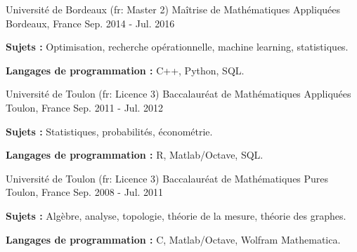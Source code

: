 

\begin{cventries}

  \cventry
    {Université de Bordeaux (fr: Master 2)} %
    {Maîtrise de Mathématiques Appliquées} %
    {Bordeaux, France} %
    {Sep. 2014 - Jul. 2016} %
    {
    \begin{cvitems} %
        \item {\textbf{Sujets :} Optimisation, recherche opérationnelle, machine learning, statistiques.}
        \item {\textbf{Langages de programmation :} C++, Python, SQL.}
    \end{cvitems}
    }


\cventry
    {Université de Toulon (fr: Licence 3)} %
    {Baccalauréat de Mathématiques Appliquées} %
    {Toulon, France} %
    {Sep. 2011 - Jul. 2012} %
    {
    \begin{cvitems} %
        \item {\textbf{Sujets :} Statistiques, probabilités, économétrie.}
        \item {\textbf{Langages de programmation :} R, Matlab/Octave, SQL.}
    \end{cvitems}
    }


\cventry
    {Université de Toulon (fr: Licence 3)} %
    {Baccalauréat de Mathématiques Pures} %
    {Toulon, France} %
    {Sep. 2008 - Jul. 2011} %
    {
    \begin{cvitems} %
        \item {\textbf{Sujets :} Algèbre, analyse, topologie, théorie de la mesure, théorie des graphes.}
        \item {\textbf{Langages de programmation :} C, Matlab/Octave, Wolfram Mathematica.}
    \end{cvitems}
    }



\end{cventries}
